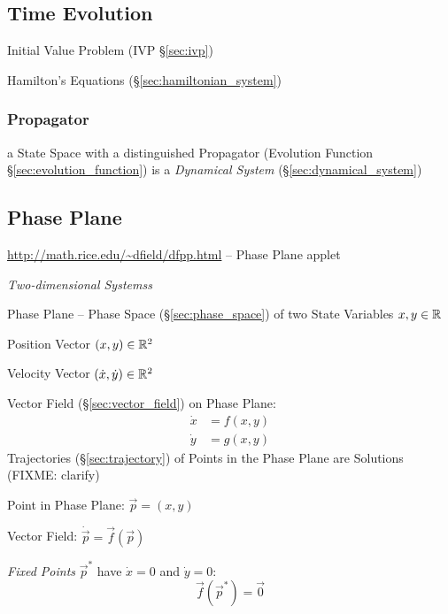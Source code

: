 \subsection{Time Evolution}\label{sec:time_evolution}

\fist Initial Value Problem (IVP \S\ref{sec:ivp})

Hamilton's Equations (\S\ref{sec:hamiltonian_system})



\subsubsection{Propagator}\label{sec:propagator}

a State Space with a distinguished Propagator (Evolution Function
\S\ref{sec:evolution_function}) is a \emph{Dynamical System}
(\S\ref{sec:dynamical_system})



\subsection{Phase Plane}\label{sec:phase_plane}

\url{http://math.rice.edu/~dfield/dfpp.html} -- Phase Plane applet

\emph{Two-dimensional Systemss}

Phase Plane -- Phase Space (\S\ref{sec:phase_space}) of two State Variables
$x,y \in \mathbb{R}$

Position Vector $(x,y) \in \mathbb{R}^2$

Velocity Vector $(\dot{x},\dot{y}) \in \mathbb{R}^2$

Vector Field (\S\ref{sec:vector_field}) on Phase Plane:
\begin{align*}
  \dot{x} & = f(x,y) \\
  \dot{y} & = g(x,y)
\end{align*}
Trajectories (\S\ref{sec:trajectory}) of Points in the Phase Plane are
Solutions (FIXME: clarify)

Point in Phase Plane: $\vec{p} = (x,y)$

Vector Field: $\dot{\vec{p}} = \vec{f}(\vec{p})$

\emph{Fixed Points} $\vec{p}^*$ have $\dot{x} = 0$ and $\dot{y} = 0$:
\[
  \vec{f}(\vec{p}^*) = \vec{0}
\]

